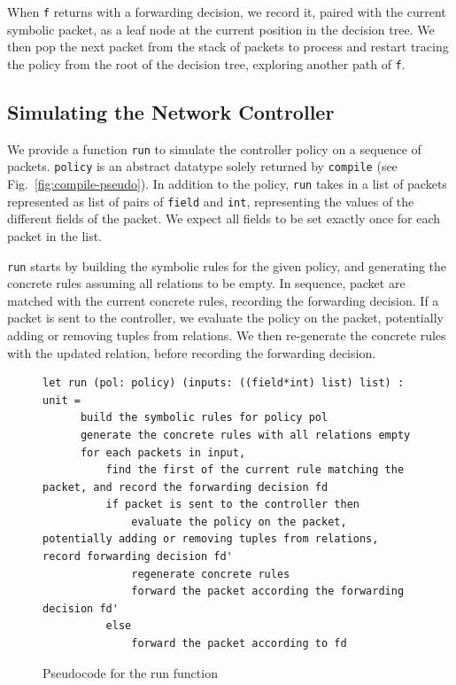 \documentclass[preprint]{sigplanconf}
\begin{document}



When \lstinline|f| returns with a forwarding decision, we record it, paired with the current symbolic packet, as a leaf node at the current position in the decision tree. We then pop the next packet from the stack of packets to process and restart tracing the policy from the root of the decision tree, exploring another path of \lstinline|f|.  


\subsection*{Simulating the Network Controller}

We provide a function \lstinline|run| to simulate the controller policy on a sequence of packets. \lstinline|policy| is an abstract datatype solely returned by \lstinline|compile| (see Fig.~\ref{fig:compile-pseudo}). In addition to the policy, \lstinline|run| takes in a list of packets represented as list of pairs of \lstinline|field| and \lstinline|int|, representing the values of the different fields of the packet. We expect all fields to be set exactly once for each packet in the list.

\lstinline|run| starts by building the symbolic rules for the given policy, and generating the concrete rules assuming all relations to be empty. In sequence, packet are matched with the current concrete rules, recording the forwarding decision. If a packet is sent to the controller, we evaluate the policy on the packet, potentially adding or removing tuples from relations. We then re-generate the concrete rules with the updated relation, before recording the forwarding decision.

\begin{figure}[ht]
\begin{lstlisting}
let run (pol: policy) (inputs: ((field*int) list) list) : unit =
      build the symbolic rules for policy pol
      generate the concrete rules with all relations empty
      for each packets in input,
          find the first of the current rule matching the packet, and record the forwarding decision fd
          if packet is sent to the controller then
              evaluate the policy on the packet, potentially adding or removing tuples from relations, record forwarding decision fd'
              regenerate concrete rules
              forward the packet according the forwarding decision fd'
          else
              forward the packet according to fd 
\end{lstlisting}

\caption{Pseudocode for the run function}
\label{fig:run-pseudo}
  \end{figure}
\end{document}
